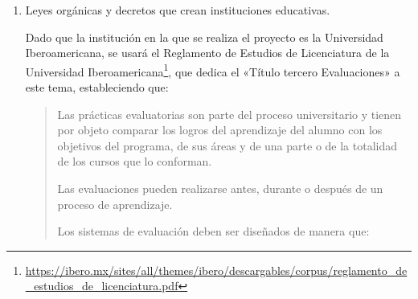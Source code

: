 \documentclass[
  12,
]{scrartcl}
\DeclareRobustCommand{\href}[2]{#2\footnote{\url{#1}}}
\providecommand{\tightlist}{%
  \setlength{\itemsep}{0pt}\setlength{\parskip}{0pt}}
\begin{document}
\begin{enumerate}
\begin{enumerate}
\begin{quote}
    En las escuelas de educación básica y media superior, la Secretaría
    emitirá los lineamientos que deberán seguir las autoridades
    educativas locales y municipales para formular los programas de
    fortalecimiento de las capacidades de administración escolar, mismos
    que tendrán como objetivos: I. Usar los resultados de la evaluación
    como retroalimentación para la mejora continua en cada ciclo
    escolar;

    \begin{enumerate}
    \def\labelenumiii{\Roman{enumiii}.}
    \setcounter{enumiii}{1}
    \tightlist
    \item
      Desarrollar una planeación anual de actividades, con metas
      verificables y puestas en conocimiento de la autoridad y la
      comunidad escolar, y
    \item
      Administrar en forma transparente y eficiente los recursos que
      reciba para mejorar su infraestructura, comprar materiales
      educativos, resolver problemas de operación básicos y propiciar
      condiciones de participación para que alumnos, maestras, maestros,
      madres y padres de familia o tutores, bajo el liderazgo del
      director, se involucren en la resolución de los retos que cada
      escuela enfrenta.
    \end{enumerate}
    \end{quote}
  \end{enumerate}
\item
  Leyes orgánicas y decretos que crean instituciones educativas.

  Dado que la institución en la que se realiza el proyecto es la
  Universidad Iberoamericana, se usará el
  \href{https://ibero.mx/sites/all/themes/ibero/descargables/corpus/reglamento_de_estudios_de_licenciatura.pdf}{Reglamento
  de Estudios de Licenciatura de la Universidad Iberoamericana}, que
  dedica el «Título tercero Evaluaciones» a este tema, estableciendo
  que:

  \begin{quote}
  Las prácticas evaluatorias son parte del proceso universitario y
  tienen por objeto comparar los logros del aprendizaje del alumno con
  los objetivos del programa, de sus áreas y de una parte o de la
  totalidad de los cursos que lo conforman.

  Las evaluaciones pueden realizarse antes, durante o después de un
  proceso de aprendizaje.

  Los sistemas de evaluación deben ser diseñados de manera que:


\end{quote}
\end{enumerate}
\end{document}
